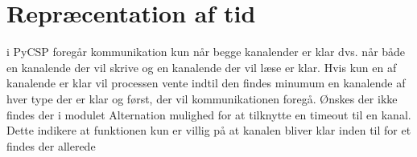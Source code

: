 \section{Repræcentation af tid}
i PyCSP foregår kommunikation kun når begge kanalender er klar dvs.
når både en kanalende der vil skrive og en kanalende der vil læse
er klar. Hvis kun en af kanalende er klar vil processen vente indtil
den findes minumum en kanalende af hver type der er klar og først,
der vil kommunikationen foregå. Ønskes der ikke findes der i modulet
Alternation mulighed for at tilknytte en timeout til en kanal. Dette
indikere at funktionen kun er villig på at kanalen bliver klar inden
til for et findes der allerede  
